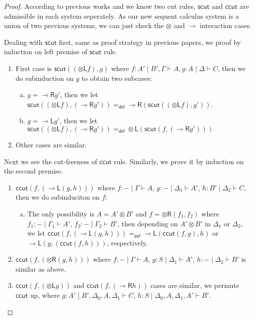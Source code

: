 \documentclass{article}
\newtheorem*{proof}{Proof : }
\newcommand{\tl}{\otimes \mathsf{L}}
\newcommand{\tr}{\otimes \mathsf{R}}
\newcommand{\lright}{\multimap \mathsf{R}}
\newcommand{\lleft}{\multimap \mathsf{L}}
\newcommand{\ot}{\otimes}
\newcommand{\lolli}{\multimap}
\newcommand{\defeq}{=_{\mathsf{def}}}
\begin{document}
\begin{proof}
  According to previous works \cite{uustalu_sequent_2018} and \cite{uustalu_deductive_nodate} we know two cut rules, $\mathsf{scut}$ and $\mathsf{ccut}$ are admissible in each system seperately.
  As our new sequent calculus system is a union of two previous systems, we can just check the $\ot$ and $\lolli$ interaction cases.

  Dealing with $\mathsf{scut}$ first, same as proof strategy in previous papers, we proof by induction on left premise of $\mathsf{scut}$ rule.
  \begin{enumerate}[1. ]
    \item First case is $\mathsf{scut} ((\tl f), g)$ where $f : A' \mid B' , \Gamma \vdash A, g : A \mid \Delta \vdash C$, then we do subinduction on $g$ to obtain two subcases:
          \begin{enumerate}[a. ]
            \item $g = \lright g'$, then we let $\mathsf{scut} ((\tl f), (\lright g')) \defeq \lright (\mathsf{scut} ((\tl f), g'))$.
            \item $g = \lleft g'$, then we let $\mathsf{scut} ((\tl f), (\lright g')) \defeq \tl (\mathsf{scut} (f, (\lright g')))$
          \end{enumerate}
    \item Other cases are similar.
  \end{enumerate}
  Next we see the cut-freeness of $\mathsf{ccut}$ rule.
  Similarly, we prove it by induction on the second premise.
  \begin{enumerate}[1. ]
    \item $\mathsf{ccut} (f , (\lleft (g, h)))$ where $f : - \mid \Gamma \vdash A$, $g : - \mid \Delta_1 \vdash A'$, $h : B' \mid \Delta_2 \vdash C$, then we do subinduciton on $f$:
    \begin{enumerate}[a. ]
      \item The only possibility is $A = A' \ot B'$ and $f = \tr (f_1, f_2)$ where $f_1 : - \mid \Gamma_1 \vdash A'$, $f_2 : - \mid \Gamma_2 \vdash B'$, then depending on $A' \ot B'$ in $\Delta_1$ or $\Delta_2$,
      we let $\mathsf{ccut} (f , (\lleft (g, h))) \defeq \lleft (\mathsf{ccut} (f, g), h)$ or $ \lleft (g, (\mathsf{ccut} (f, h)))$, respectively.
    \end{enumerate}
    \item $\mathsf{ccut} (f , (\tr (g, h)))$ where $f : - \mid \Gamma \vdash A$, $g : S \mid \Delta_1 \vdash A'$, $h : - \mid \Delta_2 \vdash B'$ is similar as above.
    \item $\mathsf{ccut} (f, (\tl g))$ and
    $\mathsf{ccut} (f, (\lright h))$ cases are similar, we permute $\mathsf{ccut}$ up,
    where $g : A' \mid B' , \Delta_0 , A , \Delta_1 \vdash C$, $h : S \mid \Delta_0 , A , \Delta_1 , A' \vdash B'$.
  \end{enumerate}
\end{proof}
\end{document}
